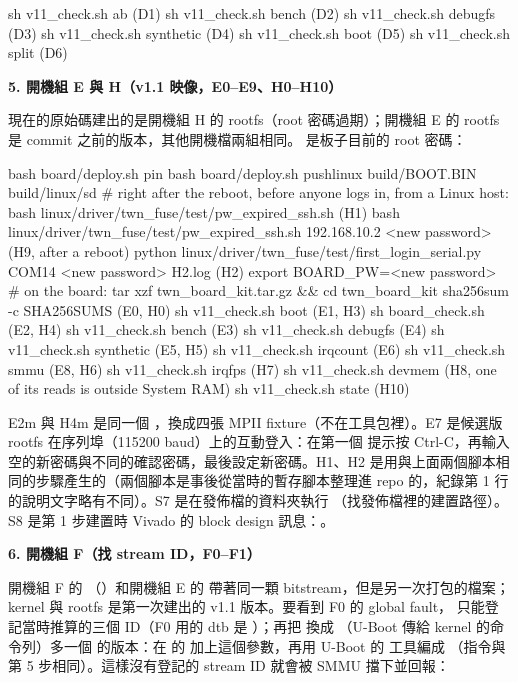 \begin{cmdline}
sh v11_check.sh ab          (D1)     sh v11_check.sh bench      (D2)
sh v11_check.sh debugfs     (D3)     sh v11_check.sh synthetic  (D4)
sh v11_check.sh boot        (D5)     sh v11_check.sh split      (D6)
\end{cmdline}

\textbf{5. 開機組 E 與 H（v1.1 映像，E0--E9、H0--H10）}

現在的原始碼建出的是開機組 H 的 rootfs（root 密碼過期）；開機組 E 的 rootfs 是 commit  之前的版本，其他開機檔兩組相同。 是板子目前的 root 密碼：

\begin{cmdline}
bash board/deploy.sh pin
bash board/deploy.sh pushlinux build/BOOT.BIN build/linux/sd
# right after the reboot, before anyone logs in, from a Linux host:
bash linux/driver/twn_fuse/test/pw_expired_ssh.sh                                        (H1)
bash linux/driver/twn_fuse/test/pw_expired_ssh.sh 192.168.10.2 <new password>             (H9, after a reboot)
python linux/driver/twn_fuse/test/first_login_serial.py COM14 <new password> H2.log      (H2)
export BOARD_PW=<new password>
# on the board: tar xzf twn_board_kit.tar.gz && cd twn_board_kit
sha256sum -c SHA256SUMS (E0, H0)   sh v11_check.sh boot (E1, H3)   sh board_check.sh (E2, H4)
sh v11_check.sh bench (E3)   sh v11_check.sh debugfs (E4)   sh v11_check.sh synthetic (E5, H5)
sh v11_check.sh irqcount (E6)   sh v11_check.sh smmu (E8, H6)   sh v11_check.sh irqfps (H7)
sh v11_check.sh devmem (H8, one of its reads is outside System RAM)
sh v11_check.sh state (H10)
\end{cmdline}

E2m 與 H4m 是同一個 ，換成四張 MPII fixture（不在工具包裡）。E7 是候選版 rootfs 在序列埠（115200 baud）上的互動登入：在第一個  提示按 Ctrl-C，再輸入空的新密碼與不同的確認密碼，最後設定新密碼。H1、H2 是用與上面兩個腳本相同的步驟產生的（兩個腳本是事後從當時的暫存腳本整理進 repo 的，紀錄第 1 行的說明文字略有不同）。S7 是在發佈檔的資料夾執行 （找發佈檔裡的建置路徑）。S8 是第 1 步建置時 Vivado 的 block design 訊息：。

\textbf{6. 開機組 F（找 stream ID，F0--F1）}

開機組 F 的 （）和開機組 E 的  帶著同一顆 bitstream，但是另一次打包的檔案；kernel 與 rootfs 是第一次建出的 v1.1 版本。要看到 F0 的 global fault， 只能登記當時推算的三個 ID（F0 用的 dtb 是 ）；再把  換成 （U-Boot 傳給 kernel 的命令列）多一個  的版本：在  的  加上這個參數，再用 U-Boot 的  工具編成 （指令與  第 5 步相同）。這樣沒有登記的 stream ID 就會被 SMMU 擋下並回報：

